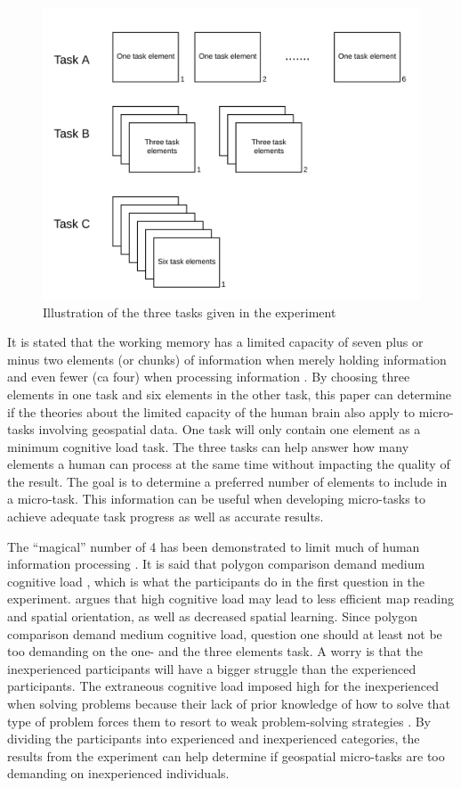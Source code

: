 \begin{figure}[H]
	\centering
	\includegraphics[width=0.7\linewidth]{fig/illustration_microtasks}
	\caption{Illustration of the three tasks given in the experiment}
	\label{fig:illustrationmicrotasks}
\end{figure}


It is stated that the working memory has a limited capacity of seven plus or minus two elements (or chunks) of information when merely holding information and even fewer (ca four) when processing information \citep{Leppink2014a}. By choosing three elements in one task and six elements in the other task, this paper can determine if the theories about the limited capacity of the human brain also apply to micro-tasks involving geospatial data. One task will only contain one element as a minimum cognitive load task. The three tasks can help answer how many elements a human can process at the same time without impacting the quality of the result. The goal is to determine a preferred number of elements to include in a micro-task. This information can be useful when developing micro-tasks to achieve adequate task progress as well as accurate results.

The “magical” number of 4 has been demonstrated to limit much of human information processing \citep{Mandler2013}. It is said that polygon comparison demand medium cognitive load \citep{Kiefer2016}, which is what the participants do in the first question in the experiment. \cite{Kiefer2016} argues that high cognitive load may lead to less efficient map reading and spatial orientation, as well as decreased spatial learning. Since polygon comparison demand medium cognitive load, question one should at least not be too demanding on the one- and the three elements task. A worry is that the inexperienced participants will have a bigger struggle than the experienced participants. The extraneous cognitive load imposed high for the inexperienced when solving problems because their lack of prior knowledge of how to solve that type of problem forces them to resort to weak problem-solving strategies \citep{Leppink2014a}. By dividing the participants into experienced and inexperienced categories, the results from the experiment can help determine if geospatial micro-tasks are too demanding on inexperienced individuals. 

